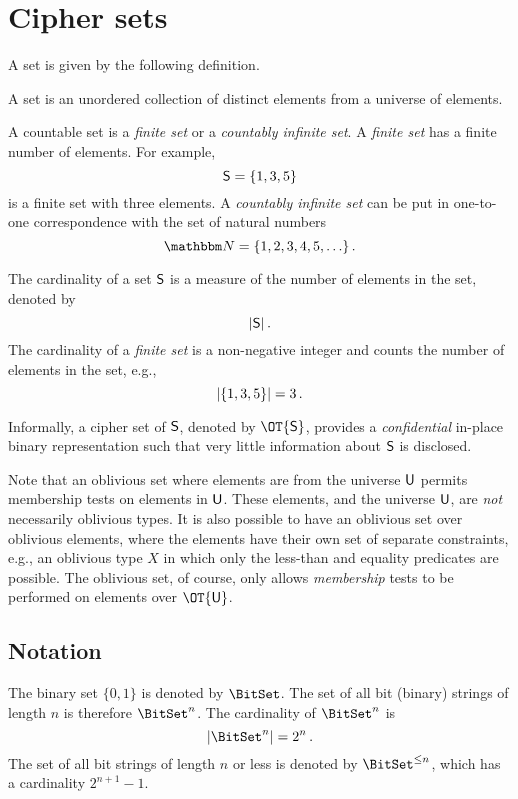 \documentclass[ ../main.tex]{subfiles}
\begin{document}
\section{Cipher sets}
\label{sec:ob_set_def}
A set is given by the following definition.
\begin{definition}
A set is an unordered collection of distinct elements from a universe of elements.
\end{definition}

A countable set is a \emph{finite set} or a \emph{countably infinite set}. A \emph{finite set} has a finite number of elements. For example,
\[
    \Set{S} = \{ 1, 3, 5 \}
\]
is a finite set with three elements. A \emph{countably infinite set} can be put in one-to-one correspondence with the set of natural numbers
\begin{equation}
    \NatSet = \{1,2,3,4,5,\ldots\}\,.
\end{equation}

The cardinality of a set $\Set{S}$ is a measure of the number of elements in the set, denoted by
\begin{equation}
    \Card{\Set{S}}\,.
\end{equation}
The cardinality of a \emph{finite set} is a non-negative integer and counts the number of elements in the set, e.g.,
\[
    \lvert\left\{ 1, 3, 5\right\}\rvert = 3\,.
\]

Informally, a cipher set of $\Set{S}$, denoted by $\OT{\Set{S}}$, provides a \emph{confidential} in-place binary representation such that very little information about $\Set{S}$ is disclosed.

Note that an oblivious set where elements are from the universe $\Set{U}$ permits membership tests on elements in $\Set{U}$.
These elements, and the universe $\Set{U}$, are \emph{not} necessarily oblivious types.
It is also possible to have an oblivious set over oblivious elements, where the elements have their own set of separate constraints, e.g., an oblivious type $X$ in which only the less-than and equality predicates are possible.
The oblivious set, of course, only allows \emph{membership} tests to be performed on elements over $\OT{\Set{U}}$.

\subsection{Notation}
The binary set $\{0,1\}$ is denoted by $\BitSet$. The set of all bit (binary) strings of length $n$ is therefore $\BitSet^n$. The cardinality of $\BitSet^n$ is
\begin{equation}
\Card{\BitSet^n} = 2^n\,.
\end{equation}
The set of all bit strings of length $n$ or less is denoted by $\BitSet^{\leq n}$, which has a cardinality $2^{n+1}-1$.
\end{document}
